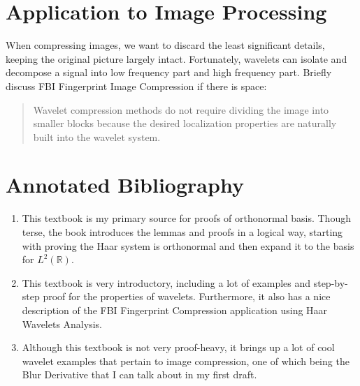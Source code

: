 \documentclass[11pt]{amsart}
\theoremstyle{theorem} %
\theoremstyle{definition}                  %
\theoremstyle{example}                       %
\theoremstyle{remark}                       %
\numberwithin{equation}{section}
\newcommand{\R}{\mathbb{R}}
\begin{document}
\section{Application to Image Processing}
 When compressing images, we want to discard the least significant details, keeping the original picture largely intact. Fortunately, wavelets can isolate and decompose a signal into low frequency part and high frequency part.
 Briefly discuss FBI Fingerprint Image Compression if there is space:
 \begin{quote}
 	 Wavelet compression methods do not require dividing the image into smaller blocks because the desired localization properties are naturally built into the wavelet system.\cite{Frazier_1999}
 \end{quote}
 
\section{Annotated Bibliography}
\begin{enumerate}
	\item {}
	
	\smallskip
	This textbook is my primary source for proofs of orthonormal basis. Though terse, the book introduces the lemmas and proofs in a logical way, starting with proving the Haar system is orthonormal and then expand it to the basis for $L^2(\R)$.
		
	\item {}
	
	\smallskip
	This textbook is very introductory, including a lot of examples and step-by-step proof for the properties of wavelets. Furthermore, it also has a nice description of the FBI Fingerprint Compression application using Haar Wavelets Analysis.	
	
	\item {}
	
	\smallskip
	Although this textbook is not very proof-heavy, it brings up a lot of cool wavelet examples that pertain to image compression, one of which being the Blur Derivative that I can talk about in my first draft.
\end{enumerate}
\end{document}

